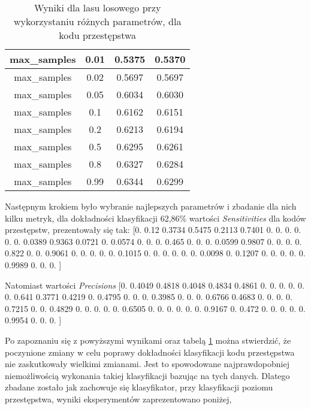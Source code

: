 \documentclass{classrep}
\begin{document}
{{\begin{table}
\begin{tabular}{|c|c|c|c|}
                    max\_samples & 0.01 & 0.5375 & 0.5370 \\ \hline
                    max\_samples & 0.02 & 0.5697 & 0.5697 \\ \hline
                    max\_samples & 0.05 & 0.6034 & 0.6030 \\ \hline
                    max\_samples & 0.1 & 0.6162 & 0.6151 \\ \hline
                    max\_samples & 0.2 & 0.6213 & 0.6194 \\ \hline
                    max\_samples & 0.5 & 0.6295 & 0.6261 \\ \hline
                    max\_samples & 0.8 & 0.6327 & 0.6284 \\ \hline
                    max\_samples & 0.99 & 0.6344 & 0.6299 \\ \hline

                    \hline
                \end{tabular}
                \caption{Wyniki dla lasu losowego przy wykorzystaniu różnych parametrów, dla kodu
                przestępstwa}
                \label{tab:forest_parameters_keyCode}
            \end{table}
            \FloatBarrier

            Następnym krokiem było wybranie najlepszych parametrów i zbadanie dla nich kilku metryk, dla
            dokładności klasyfikacji 62,86\% wartości \textit{Sensitivities} dla kodów przestępstw,
            prezentowały się tak:
            [0. 0.12 0.3734 0.5475 0.2113 0.7401 0. 0. 0. 0.
            0. 0. 0.0389 0.9363 0.0721 0. 0.0574 0. 0. 0.
            0.465 0. 0. 0. 0.0599 0.9807 0. 0. 0. 0.
            0.822 0. 0. 0.9061 0. 0. 0. 0. 0. 0.1015
            0. 0. 0. 0. 0. 0. 0.0098 0. 0.1207 0.
            0. 0. 0. 0. 0.9989 0. 0. 0.    ]

            Natomiast wartości \textit{Precisions}
            [0. 0.4049 0.4818 0.4048 0.4834 0.4861 0. 0. 0. 0.
            0. 0. 0.641 0.3771 0.4219 0. 0.4795 0. 0. 0.
            0.3985 0. 0. 0. 0.6766 0.4683 0. 0. 0. 0.
            0.7215 0. 0. 0.4829 0. 0. 0. 0. 0. 0.6505
            0. 0. 0. 0. 0. 0. 0.9167 0. 0.472 0.
            0. 0. 0. 0. 0.9954 0. 0. 0.    ]


            Po zapoznaniu się z powyższymi wynikami oraz tabelą \ref{tab:forest_parameters_keyCode} można
            stwierdzić, że poczynione zmiany w celu poprawy dokładności klasyfikacji kodu przestępstwa nie
            zaskutkowały wielkimi zmianami. Jest to spowodowane najprawdopobniej niemożliwością wykonania
            takiej klasyfikacji bazując na tych danych. Dlatego zbadane zostało jak zachowuje się
            klasyfikator, przy klasyfikacji poziomu przestępstwa, wyniki eksperymentów zaprezentowano poniżej,


}}
\end{document}
